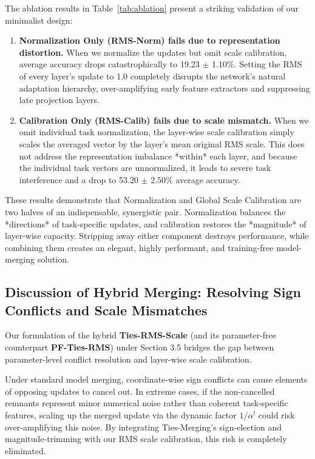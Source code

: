 The ablation results in Table~\ref{tab:ablation} present a striking validation of our minimalist design:
\begin{enumerate}
    \item \textbf{Normalization Only (RMS-Norm) fails due to representation distortion.} When we normalize the updates but omit scale calibration, average accuracy drops catastrophically to 19.23 $\pm$ 1.10\%. Setting the RMS of every layer's update to 1.0 completely disrupts the network's natural adaptation hierarchy, over-amplifying early feature extractors and suppressing late projection layers.
    \item \textbf{Calibration Only (RMS-Calib) fails due to scale mismatch.} When we omit individual task normalization, the layer-wise scale calibration simply scales the averaged vector by the layer's mean original RMS scale. This does not address the representation imbalance *within* each layer, and because the individual task vectors are unnormalized, it leads to severe task interference and a drop to 53.20 $\pm$ 2.50\% average accuracy.
\end{enumerate}

These results demonstrate that Normalization and Global Scale Calibration are two halves of an indispensable, synergistic pair. Normalization balances the *directions* of task-specific updates, and calibration restores the *magnitude* of layer-wise capacity. Stripping away either component destroys performance, while combining them creates an elegant, highly performant, and training-free model-merging solution.

\subsection{Discussion of Hybrid Merging: Resolving Sign Conflicts and Scale Mismatches}
Our formulation of the hybrid \textbf{Ties-RMS-Scale} (and its parameter-free counterpart \textbf{PF-Ties-RMS}) under Section 3.5 bridges the gap between parameter-level conflict resolution and layer-wise scale calibration. 

Under standard model merging, coordinate-wise sign conflicts can cause elements of opposing updates to cancel out. In extreme cases, if the non-cancelled remnants represent minor numerical noise rather than coherent task-specific features, scaling up the merged update via the dynamic factor $1/\alpha^l$ could risk over-amplifying this noise. By integrating Ties-Merging's sign-election and magnitude-trimming with our RMS scale calibration, this risk is completely eliminated. 


